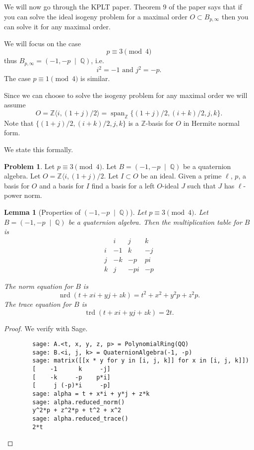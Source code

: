 \documentclass[10pt]{article}
\theoremstyle{plain}
\newtheorem{lemma}[theorem]{Lemma}
\theoremstyle{definition}
\newtheorem{problem}[theorem]{Problem}
\newcommand{\op}{\operatorname}
\newcommand{\Z}{\mathbb{Z}}
\newcommand{\Q}{\mathbb{Q}}
\newcommand{\nrd}{\op{nrd}}
\newcommand{\trd}{\op{trd}}
\begin{document}
We will now go through the KPLT paper.
Theorem 9 of the paper says that if you can solve the ideal isogeny problem for a maximal order \( O \subset B_{p, \infty} \) then you can solve it for any  maximal order.


We will focus on the case
\[
    p \equiv 3 \pmod{4}
\]
thus \( B_{p, \infty} = (-1, -p \; \mid \; \Q) \), i.e.
\[
    i^2 = -1 \text{ and } j^2 = -p.
\]
The case \( p \equiv 1 \pmod{4} \) is similar.

Since we can choose to solve the isogeny problem for any maximal order we will assume
\[
    O = \Z \langle i, (1+j) / 2 \rangle = \op{span}_\Z \{ (1+j) / 2, (i+k) / 2 , j, k \}.
\]
Note that \( \{ (1+j) / 2, (i+k) / 2 , j, k \} \) is a \( \Z \)-basis for \( O \) in Hermite normal form.

We state this formally.

\begin{problem} \label{prob: general}
Let \( p \equiv 3 \pmod{4} \).
Let \( B =  (-1, -p \; \mid \; \Q) \) be a quaternion algebra.
Let \( O = \Z \langle i, (1+j) / 2 \).
Let \( I \subset O \) be an ideal.
Given a prime \( \ell \), \( p \), a basis for \( O \) and a basis for \( I \) find a basis for a left \( O \)-ideal \( J \) such that \( J \) has \( \ell \)-power norm.
\end{problem}

\begin{lemma}[Properties of \( (-1, -p \; \mid \; \Q) \)]
    Let \( p \equiv 3 \pmod{4} \).
    Let \( B =  (-1, -p \; \mid \; \Q) \) be a quaternion algebra.
    Then the multiplication table for \( B \) is
    \[
        \begin{array}{c|ccc}
              & i  & j   & k  \\
            \hline
            i & -1 & k   & -j \\
            j & -k & -p  & pi \\
            k & j  & -pi & -p
        \end{array}
    \]

    The norm equation for \( B \) is
    \[
        \nrd(t + xi + yj + zk) = t^2 + x^2 + y^2p + z^2p.
    \]
    The trace equation for \( B \) is
    \[
        \trd(t + xi + yj + zk) = 2t.
    \]
\end{lemma}
\begin{proof}
    We verify with Sage.
    \begin{lstlisting}
        sage: A.<t, x, y, z, p> = PolynomialRing(QQ)
        sage: B.<i, j, k> = QuaternionAlgebra(-1, -p)
        sage: matrix([[x * y for y in [i, j, k]] for x in [i, j, k]])
        [    -1      k     -j]
        [    -k     -p    p*i]
        [     j (-p)*i     -p]
        sage: alpha = t + x*i + y*j + z*k
        sage: alpha.reduced_norm()
        y^2*p + z^2*p + t^2 + x^2
        sage: alpha.reduced_trace()
        2*t
    \end{lstlisting}
\end{proof}
\end{document}
